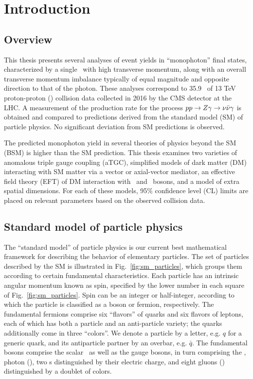 \documentclass[oneside, letterpaper, 12pt, oldfontcommands]{memoir}
\begin{document}
\mainmatter

\chapter{Introduction} \label{sec:introduction}
\section{Overview} \label{sec:introduction_overview}
This thesis presents several analyses of event
yields in ``monophoton'' final states, characterized by a single \Pgamma\ with high transverse
momentum, along with an overall transverse momentum imbalance typically of equal magnitude and opposite direction to
that of the photon.
These analyses correspond to 35.9 \fbinv\ of 13 TeV proton-proton (\Pp\Pp) collision data collected in 2016 by the CMS
detector at the LHC. A measurement of the production rate for the process $pp \to Z\gamma \to \nu\bar{\nu}\gamma$ is obtained
and compared to predictions derived from the standard model (SM) of particle physics. No significant deviation from SM
predictions is observed.

The predicted monophoton yield in several theories of physics beyond the SM (BSM) is higher than the SM prediction.
This thesis examines two varieties of anomalous triple gauge coupling (aTGC), simplified models of dark matter (DM)
interacting with SM matter via a vector or axial-vector mediator, an effective field theory (EFT) of DM interaction
with  \Pgamma\ and \PZ\ bosons, and a model of extra spatial dimensions. For each of these models, 95\% confidence level (CL)
limits are placed on relevant parameters based on the observed collision data.

\section{Standard model of particle physics} \label{sec:introduction_standard_model}
The ``standard model'' of particle physics is our current best mathematical framework for describing the behavior
of elementary particles. The set of particles described by the SM is illustrated in Fig.~\ref{fig:sm_particles}, which
groups them according to certain fundamental characteristics.
Each particle has an intrinsic angular momentum known as spin, specified by the lower number in each square of Fig.~\ref{fig:sm_particles}.
Spin can be an integer or half-integer, according to which the particle is classified as a boson or fermion, respectively.
The fundamental fermions comprise six ``flavors'' of quarks and six flavors of leptons,
each of which has both a particle and an anti-particle variety; the quarks additionally come in three ``colors''.
We denote a particle by a letter, e.g. $q$ for a generic quark, and its antiparticle partner by an overbar, e.g. $\bar{q}$.
The fundamental bosons comprise the scalar \PH\ as well as the gauge bosons, in turn comprising the \PZ, photon (\Pgamma),
two \PW s distinguished by their electric charge, and eight gluons (\Pg) distinguished by a doublet of colors.
\end{document}

